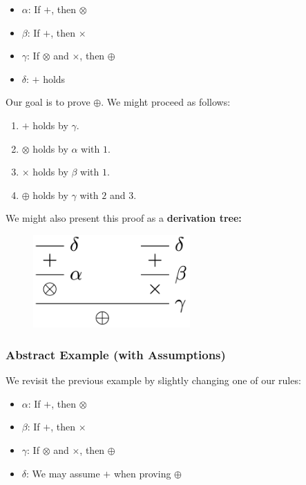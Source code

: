 \documentclass[a4paper]{extarticle}
\begin{document}
\begin{itemize}
    \item \(\alpha\): If \(+\), then \(\otimes\)
    \item \(\beta\): If \(+\), then \(\times\)
    \item \(\gamma\): If \(\otimes\) and \(\times\), then \(\oplus\)
    \item \(\delta\): \(+\) holds
\end{itemize}

Our goal is to prove \(\oplus\). We might proceed as follows:

\begin{enumerate}
    \item \(+\) holds by \(\gamma\).
    \item \(\otimes\) holds by \(\alpha\) with \(1\).
    \item \(\times\) holds by \(\beta\) with \(1\).
    \item \(\oplus\) holds by \(\gamma\) with \(2\) and \(3\).
\end{enumerate}

We might also present this proof as a \textbf{derivation tree:}

\begin{figure}[H]
    \includegraphics[width=6cm]{../images/FMFP_Fig1-2}
    \centering
\end{figure}

\subsubsection{Abstract Example (with Assumptions)}

We revisit the previous example by slightly changing one of our rules:

\begin{itemize}
    \item \(\alpha\): If \(+\), then \(\otimes\)
    \item \(\beta\): If \(+\), then \(\times\)
    \item \(\gamma\): If \(\otimes\) and \(\times\), then \(\oplus\)
    \item \(\delta\): We may assume \(+\) when proving \(\oplus\)
\end{itemize}
\end{document}
